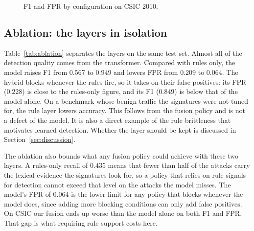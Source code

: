\documentclass[preprint,11pt]{elsarticle}
\let\footnotesize\normalsize
\begin{document}
\begin{figure}[t]
\centering
{}
\caption{F1 and FPR by configuration on CSIC 2010.}
\label{fig:bars}
\end{figure}

\subsection{Ablation: the layers in isolation}
Table~\ref{tab:ablation} separates the layers on the same test set. Almost
all of the detection quality comes from the transformer. Compared with
rules only, the model raises F1 from $0.567$ to $0.949$ and lowers FPR from
$0.209$ to $0.064$. The hybrid blocks whenever the rules fire, so it takes
on their false positives: its FPR ($0.228$) is close to the rules-only
figure, and its F1 ($0.849$) is below that of the model alone. On a
benchmark whose benign traffic the signatures were not tuned for, the rule
layer lowers accuracy. This follows from the fusion policy and is not a
defect of the model. It is also a direct example of the rule brittleness
that motivates learned detection. Whether the layer should be kept is
discussed in Section~\ref{sec:discussion}.

The ablation also bounds what any fusion policy could achieve with these
two layers. A rules-only recall of $0.435$ means that fewer than half of
the attacks carry the lexical evidence the signatures look for, so a policy
that relies on rule signals for detection cannot exceed that level on the
attacks the model misses. The model's FPR of $0.064$ is the lower limit for
any policy that blocks whenever the model does, since adding more blocking
conditions can only add false positives. On CSIC our fusion ends up worse
than the model alone on both F1 and FPR. That gap is what requiring rule
support costs here.
\end{document}
